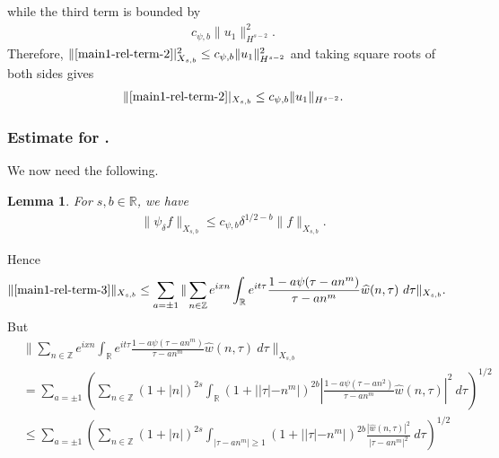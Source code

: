 \documentclass[12pt,reqno]{amsart}
\numberwithin{equation}{section}  %
\renewcommand{\cref}{\Cref}
\newcommand{\rr}{\mathbb{R}}
\newcommand{\zz}{\mathbb{Z}}
\newcommand{\wh}{\widehat}
\newtheorem{lemma}[theorem]{Lemma}
\begin{document}
while the third term is bounded by  
%
%
\begin{equation*}
\begin{split}
  c_{\psi,b}  \| u_{1} \|_{H^{s-2}}^{2}.
\end{split}
\end{equation*}
%
%
Therefore, 
$\|\cref{main1-rel-term-2}|_{X_{s,b}}^{2} \le c_{\psi,b} 
\|u_{1}\|_{H^{s-2}}^2$ and
taking square roots of both sides gives
%
%
\begin{equation}
  \label{u-1-est}
  \begin{split}
    \|\cref{main1-rel-term-2}|_{X_{s,b}} \le c_{\psi,b} 
    \|u_{1}\|_{H^{s-2}}.
  \end{split}
\end{equation}
%
%
%
%
\subsubsection{Estimate for \cref{main1-rel-term-3}.}
%
%
%
%
%
%
%
%
%
We now need the following.
%
\begin{lemma}
\label{lem:schwartz-mult}
For $s, b \in \rr$, we have
%
%
\begin{equation}
	\label{schwartz-mult}
	\begin{split}
    \|\psi_{\delta} f \|_{X_{s,b}} \le c_{\psi, b} \delta^{1/2-b} \|f \|_{X_{s,b}}.
	\end{split}
\end{equation}
%
%
\end{lemma}
%
Hence
%
%
\begin{equation}
  \label{yu}
	\begin{split}
		\|\cref{main1-rel-term-3}\|_{X_{s,b}} 
    & \le 
    \sum_{a = \pm 1} \| \sum_{n \in \zz}  e^{ixn} \int_\rr 
		e^{it \tau} \frac{1 - a\psi (\tau - an^{m} ) 
}{\tau - an^{m}} \wh{w}(n, \tau) \ 
		d \tau\|_{X_{s,b}}.
			\end{split}
\end{equation}
%
But
%
%
\begin{equation}
\label{main-int2-est-X-s-part}
\begin{split}
  & \| \sum_{n \in \zz} e^{ixn} \int_\rr 
		e^{it \tau} \frac{1 - a\psi (\tau - an^{m} ) 
  }{\tau - an^{m}} \wh{w}(n, \tau) \ 
		d \tau\|_{X_{s,b}}
		\\
    & = \sum_{a = \pm 1}\left( \sum_{n \in \zz} \left (1 + |n| \right )^{2s} \int_\rr
    (1 + |  |\tau| - n^{m}|)^{2b} \left | \frac{1 - a\psi(\tau - an^{2 
})}{\tau - an^{m}} 
     \wh{w}(n, \tau) \right |^2 \ d 
		\tau \right)^{1/2}
		\\
    & \le \sum_{a = \pm 1}
    \left( \sum_{n \in \zz} \left (1 + |n| \right )^{2s} \int_{| \tau - an^{m}| \ge 1}
    (1 + | |\tau| - n^{m}|)^{2b} \frac{|  \wh{w}(n, \tau)|^2}{|\tau - an^{m}|^2} 
		\ d 
		\tau \right)^{1/2}
  \end{split}
\end{equation}
\end{document}

